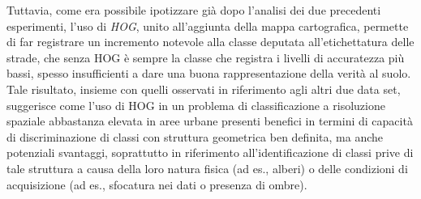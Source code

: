 Tuttavia, come era possibile ipotizzare già dopo l'analisi dei due
precedenti esperimenti, l'uso di \emph{HOG}, unito all'aggiunta della
mappa cartografica, permette di far registrare un incremento notevole
alla classe deputata all'etichettatura delle strade, che senza HOG è
sempre la classe che registra i livelli di accuratezza più bassi,
spesso insufficienti a dare una buona rappresentazione della verità al
suolo. Tale risultato, insieme con quelli osservati in riferimento
agli altri due data set, suggerisce come l'uso di HOG in un problema
di classificazione a risoluzione spaziale abbastanza elevata in aree
urbane presenti benefici in termini di capacità di discriminazione di
classi con struttura geometrica ben definita, ma anche potenziali
svantaggi, soprattutto in riferimento all'identificazione di classi
prive di tale struttura a causa della loro natura fisica (ad es.,
alberi) o delle condizioni di acquisizione (ad es., sfocatura nei dati
o presenza di ombre).


